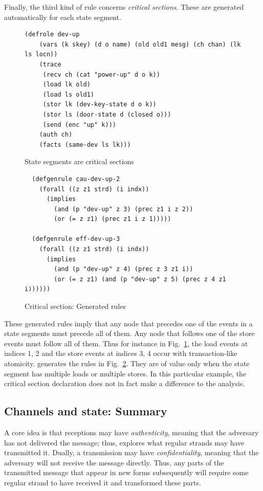 Finally, the third kind of rule concerns \emph{critical sections}.
These are generated automatically for each state segment.  
%
\begin{figure}\small
%
\begin{verbatim}(defrole dev-up
    (vars (k skey) (d o name) (old old1 mesg) (ch chan) (lk ls locn))
    (trace
     (recv ch (cat "power-up" d o k))
     (load lk old)
     (load ls old1)
     (stor lk (dev-key-state d o k))
     (stor ls (door-state d (closed o)))
     (send (enc "up" k)))
    (auth ch)
    (facts (same-dev ls lk)))
\end{verbatim}
%
  \caption{State segments are critical sections}
  \label{fig:critical:section}
\end{figure}
%
%
\begin{figure}\small
\begin{verbatim}  (defgenrule cau-dev-up-2
    (forall ((z z1 strd) (i indx))
      (implies
        (and (p "dev-up" z 3) (prec z1 i z 2))
        (or (= z z1) (prec z1 i z 1)))))

  (defgenrule eff-dev-up-3
    (forall ((z z1 strd) (i indx))
      (implies
        (and (p "dev-up" z 4) (prec z 3 z1 i))
        (or (= z z1) (and (p "dev-up" z 5) (prec z 4 z1 i))))))\end{verbatim}
%
  \caption{Critical section:  Generated rules}
  \label{fig:critical:section:rules}
\end{figure}
%
These generated rules imply that any node that precedes one of the
events in a state segments must precede all of them.  Any node that
follows one of the store events must follow all of them.  Thus for
instance in Fig.~\ref{fig:critical:section}, the load events at
indices 1, 2 and the store events at indices 3, 4 occur with
transaction-like atomicity.  {\cpsa} generates the rules in
Fig.~\ref{fig:critical:section:rules}.  They are of value only when
the state segment has multiple loads or multiple stores.  In this
particular example, the critical section declaration does not in fact
make a difference to the analysis.
%
\label{state:gen:rules:end}

\subsection{Channels and state:  Summary}
\label{sec:channels:state:summary}

A core idea is that receptions may have \emph{authenticity}, meaning
that the adversary has not delivered the message; thus, {\cpsa}
explores what regular strands may have transmitted it.  Dually, a
transmission may have \emph{confidentiality}, meaning that the
adversary will not receive the message directly.  Thus, any parts of
the transmitted message that appear in new forms subsequently will
require some regular strand to have received it and transformed these
parts.

